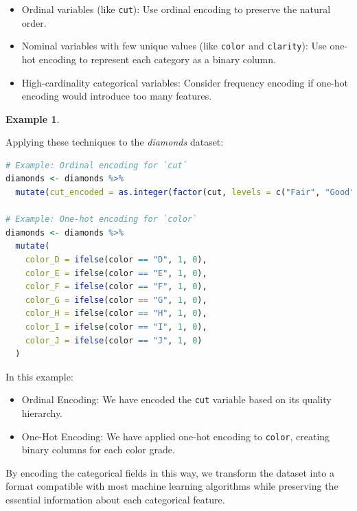 \documentclass[
]{book}
\newcommand{\passthrough}[1]{#1}
\providecommand{\tightlist}{%
  \setlength{\itemsep}{0pt}\setlength{\parskip}{0pt}}
\theoremstyle{definition}
\theoremstyle{definition}
\newtheorem{example}{Example}[chapter]
\theoremstyle{definition}
\theoremstyle{definition}
\theoremstyle{remark}
\begin{document}
\begin{itemize}
\tightlist
\item
  Ordinal variables (like \passthrough{\lstinline!cut!}): Use ordinal encoding to preserve the natural order.
\item
  Nominal variables with few unique values (like \passthrough{\lstinline!color!} and \passthrough{\lstinline!clarity!}): Use one-hot encoding to represent each category as a binary column.
\item
  High-cardinality categorical variables: Consider frequency encoding if one-hot encoding would introduce too many features.
\end{itemize}

\begin{example}
\protect\hypertarget{exm:ex-encoding}{}\label{exm:ex-encoding}

Applying these techniques to the \emph{diamonds} dataset:

\begin{lstlisting}[language=R]
# Example: Ordinal encoding for `cut`
diamonds <- diamonds %>%
  mutate(cut_encoded = as.integer(factor(cut, levels = c("Fair", "Good", "Very Good", "Premium", "Ideal"))))

# Example: One-hot encoding for `color`
diamonds <- diamonds %>%
  mutate(
    color_D = ifelse(color == "D", 1, 0),
    color_E = ifelse(color == "E", 1, 0),
    color_F = ifelse(color == "F", 1, 0),
    color_G = ifelse(color == "G", 1, 0),
    color_H = ifelse(color == "H", 1, 0),
    color_I = ifelse(color == "I", 1, 0),
    color_J = ifelse(color == "J", 1, 0)
  )
\end{lstlisting}

In this example:

\begin{itemize}
\tightlist
\item
  Ordinal Encoding: We have encoded the \passthrough{\lstinline!cut!} variable based on its quality hierarchy.
\item
  One-Hot Encoding: We have applied one-hot encoding to \passthrough{\lstinline!color!}, creating binary columns for each color grade.
\end{itemize}

\end{example}

By encoding the categorical fields in this way, we transform the dataset into a format compatible with most machine learning algorithms while preserving the essential information about each categorical feature.
\end{document}
